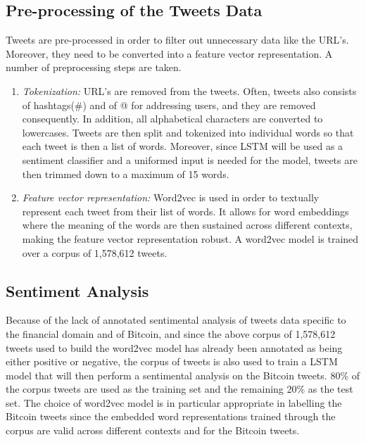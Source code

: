 \documentclass[conference]{IEEEtran}
\begin{document}
\subsection{Pre-processing of the Tweets Data}
\par Tweets are pre-processed in order to filter out unnecessary data like the URL's. Moreover, they need to be converted into a feature vector representation. A number of preprocessing steps are taken.
\begin{enumerate}
\item \textit{Tokenization:} URL's are removed from the tweets. Often, tweets also consists of hashtags(\#) and of @ for addressing users, and they are removed consequently. In addition, all alphabetical characters are converted to lowercases. Tweets are then split and tokenized into individual words so that each tweet is then a list of words. Moreover, since LSTM will be used as a sentiment classifier and a uniformed input is needed for the model, tweets are then trimmed down to a maximum of 15 words.

\item \textit{Feature vector representation:} Word2vec is used in order to textually represent each tweet from their list of words. It allows for word embeddings where the meaning of the words are then sustained across different contexts, making the feature vector representation robust. A word2vec model is trained over a corpus of 1,578,612 tweets.
\end{enumerate}

\subsection{Sentiment Analysis}
\par Because of the lack of annotated sentimental analysis of tweets data specific to the financial domain and of Bitcoin, and since the above corpus of 1,578,612 tweets used to build the word2vec model has already been annotated as being either positive or negative, the corpus of tweets is also used to train a LSTM model that will then perform a sentimental analysis on the Bitcoin tweets. 80\% of the corpus tweets are used as the training set and the remaining 20\% as the test set. The choice of word2vec model is in particular appropriate in labelling the Bitcoin tweets since the embedded word representations trained through the corpus are valid across different contexts and for the Bitcoin tweets. 
\end{document}

